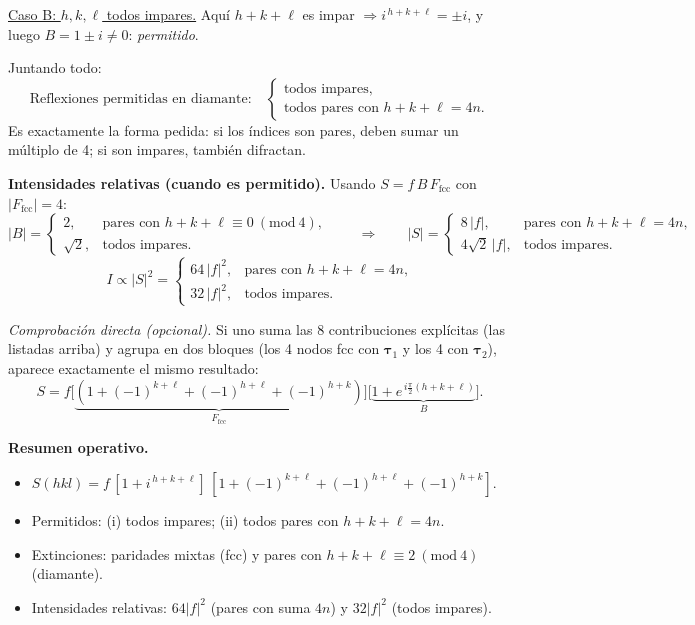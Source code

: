 \documentclass{article}
\begin{document}
\underline{Caso B: \(h,k,\ell\) todos impares.}  
Aquí \(h+k+\ell\) es impar \(\Rightarrow i^{\,h+k+\ell}=\pm i\), y luego \(B=1\pm i\neq 0\): \emph{permitido}.

\medskip
Juntando todo:
\[
\boxed{\text{Reflexiones permitidas en diamante:}\quad
\begin{cases}
\text{todos impares},\\
\text{todos pares con } h+k+\ell=4n.
\end{cases}}
\]
Es exactamente la forma pedida: si los índices son pares, deben sumar un múltiplo de 4; si son impares, también difractan.

\bigskip
\textbf{Intensidades relativas (cuando es permitido).}  
Usando \(S=f\,B\,F_\text{fcc}\) con \(|F_\text{fcc}|=4\):
\[
|B|=
\begin{cases}
2, & \text{pares con } h+k+\ell\equiv 0\ (\mathrm{mod}\ 4),\\
\sqrt{2}, & \text{todos impares}.
\end{cases}
\qquad\Longrightarrow\qquad
|S|=
\begin{cases}
8\,|f|, & \text{pares con } h+k+\ell=4n,\\
4\sqrt{2}\,|f|, & \text{todos impares}.
\end{cases}
\]
\[
\boxed{\,I\propto |S|^2=
\begin{cases}
64\,|f|^2, & \text{pares con } h+k+\ell=4n,\\
32\,|f|^2, & \text{todos impares}.
\end{cases}}
\]

\bigskip
\noindent\textit{Comprobación directa (opcional).}  
Si uno suma las 8 contribuciones explícitas (las listadas arriba) y agrupa en dos bloques (los 4 nodos fcc con \(\boldsymbol{\tau}_1\) y los 4 con \(\boldsymbol{\tau}_2\)), aparece exactamente el mismo resultado:
\[
S=f\Big[\underbrace{(1+(-1)^{k+\ell}+(-1)^{h+\ell}+(-1)^{h+k})}_{F_\text{fcc}}\Big]\Big[\underbrace{1+e^{\,i\frac{\pi}{2}(h+k+\ell)}}_{B}\Big].
\]

\bigskip
\textbf{Resumen operativo.}
\begin{itemize}
\item \(S(hkl)= f\,[1+i^{\,h+k+\ell}]\,[1+(-1)^{k+\ell}+(-1)^{h+\ell}+(-1)^{h+k}]\).
\item Permitidos: (i) todos impares; (ii) todos pares con \(h+k+\ell=4n\).
\item Extinciones: paridades mixtas (fcc) y pares con \(h+k+\ell\equiv 2\ (\mathrm{mod}\ 4)\) (diamante).
\item Intensidades relativas: \(64|f|^2\) (pares con suma \(4n\)) y \(32|f|^2\) (todos impares).
\end{itemize}
\end{document}
